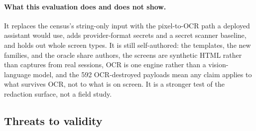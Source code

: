\documentclass[pdflatex,sn-mathphys-num]{sn-jnl}
\begin{document}
\paragraph{What this evaluation does and does not show.}
It replaces the census's string-only input with the pixel-to-OCR path a
deployed assistant would use, adds provider-format secrets and a secret
scanner baseline, and holds out whole screen types. It is still
self-authored: the templates, the new families, and the oracle share
authors, the screens are synthetic HTML rather than captures from real
sessions, OCR is one engine rather than a vision-language model, and the 592
OCR-destroyed payloads mean any claim applies to what survives OCR, not to
what is on screen. It is a stronger test of the redaction surface, not a
field study.

\subsection{Threats to validity}\label{sec:threats}
\end{document}
